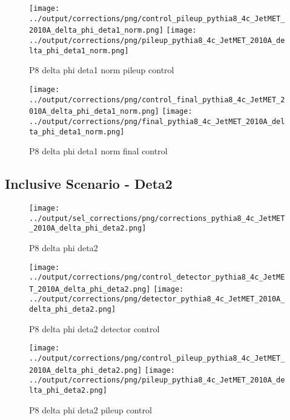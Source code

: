 \documentclass[11pt]{book}
\begin{document}
\begin{figure}[ht]
\centering
\texttt{[image: ../output/corrections/png/control\_pileup\_pythia8\_4c\_JetMET\_2010A\_delta\_phi\_deta1\_norm.png]}
\texttt{[image: ../output/corrections/png/pileup\_pythia8\_4c\_JetMET\_2010A\_delta\_phi\_deta1\_norm.png]}
\caption{P8 delta phi deta1 norm pileup control}
\label{fig:p8_JetMET_2010A_delta_phi_deta1_norm_pileup_control}
\end{figure}


\begin{figure}[ht]
\centering
\texttt{[image: ../output/corrections/png/control\_final\_pythia8\_4c\_JetMET\_2010A\_delta\_phi\_deta1\_norm.png]}
\texttt{[image: ../output/corrections/png/final\_pythia8\_4c\_JetMET\_2010A\_delta\_phi\_deta1\_norm.png]}
\caption{P8 delta phi deta1 norm final control}
\label{fig:p8_JetMET_2010A_delta_phi_deta1_norm_final_control}
\end{figure}


\clearpage
\subsection{Inclusive Scenario - Deta2}

\begin{figure}[ht]
\centering
\texttt{[image: ../output/sel\_corrections/png/corrections\_pythia8\_4c\_JetMET\_2010A\_delta\_phi\_deta2.png]}
\caption{P8 delta phi deta2}
\label{fig:p8_JetMET_2010A_delta_phi_deta2}
\end{figure}


\begin{figure}[ht]
\centering
\texttt{[image: ../output/corrections/png/control\_detector\_pythia8\_4c\_JetMET\_2010A\_delta\_phi\_deta2.png]}
\texttt{[image: ../output/corrections/png/detector\_pythia8\_4c\_JetMET\_2010A\_delta\_phi\_deta2.png]}
\caption{P8 delta phi deta2 detector control}
\label{fig:p8_JetMET_2010A_delta_phi_deta2_detector_control}
\end{figure}

\begin{figure}[ht]
\centering
\texttt{[image: ../output/corrections/png/control\_pileup\_pythia8\_4c\_JetMET\_2010A\_delta\_phi\_deta2.png]}
\texttt{[image: ../output/corrections/png/pileup\_pythia8\_4c\_JetMET\_2010A\_delta\_phi\_deta2.png]}
\caption{P8 delta phi deta2 pileup control}
\label{fig:p8_JetMET_2010A_delta_phi_deta2_pileup_control}
\end{figure}
\end{document}
